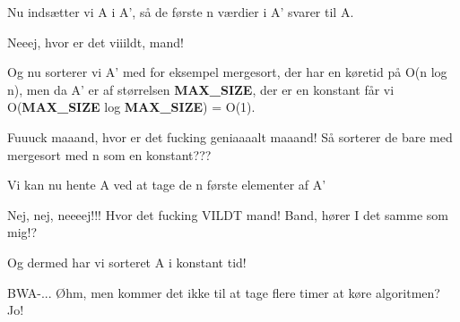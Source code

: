 \documentclass[a4paper,11pt]{article}
\begin{document}
\begin{sketch}

 Nu indsætter vi A i A’, så de første n værdier i A’ svarer til A.

 Neeej, hvor er det viiildt, mand!

 Og nu sorterer vi A’ med for eksempel mergesort, der har en køretid på O(n log n), men da A’ er af størrelsen \textbf{MAX\_SIZE}, der er en konstant får vi O(\textbf{MAX\_SIZE } log \textbf{ MAX\_SIZE}) = O(1).

 Fuuuck maaand, hvor er det fucking geniaaaalt maaand! Så sorterer de bare med mergesort med n som en konstant???


Vi kan nu hente A ved at tage de n første elementer af A’

Nej, nej, neeeej!!! Hvor det fucking VILDT mand! Band, hører I det samme som mig!?


 Og dermed har vi sorteret A i konstant tid!

 BWA-... 
 Øhm, men kommer det ikke til at tage flere timer at køre algoritmen?
 Jo!
\end{sketch}
\end{document}
